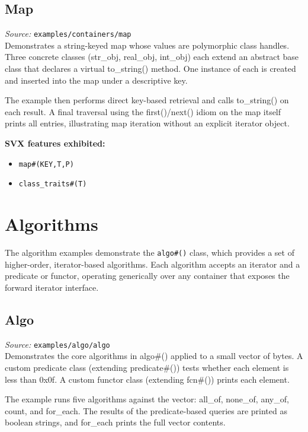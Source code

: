 \documentclass[11pt,letterpaper]{report}
\begin{document}
\section{Map}

\textit{Source:} \texttt{examples/containers/map}\\

Demonstrates a string-keyed map whose values are polymorphic class handles. Three concrete classes (str\_obj, real\_obj, int\_obj) each extend an abstract base class that declares a virtual to\_string() method. One instance of each is created and inserted into the map under a descriptive key.

The example then performs direct key-based retrieval and calls to\_string() on each result. A final traversal using the first()/next() idiom on the map itself prints all entries, illustrating map iteration without an explicit iterator object.

\textbf{SVX features exhibited:}

\begin{itemize}
  \item \texttt{map\#(KEY,T,P)}
  \item \texttt{class\_traits\#(T)}
\end{itemize}
\chapter{Algorithms}

The algorithm examples demonstrate the \texttt{algo\#()} class, which provides a set of higher-order, iterator-based algorithms. Each algorithm accepts an iterator and a predicate or functor, operating generically over any container that exposes the forward iterator interface.

\section{Algo}

\textit{Source:} \texttt{examples/algo/algo}\\

Demonstrates the core algorithms in algo\#() applied to a small vector of bytes. A custom predicate class (extending predicate\#()) tests whether each element is less than 0x0f. A custom functor class (extending fcn\#()) prints each element.

The example runs five algorithms against the vector: all\_of, none\_of, any\_of, count, and for\_each. The results of the predicate-based queries are printed as boolean strings, and for\_each prints the full vector contents.
\end{document}
